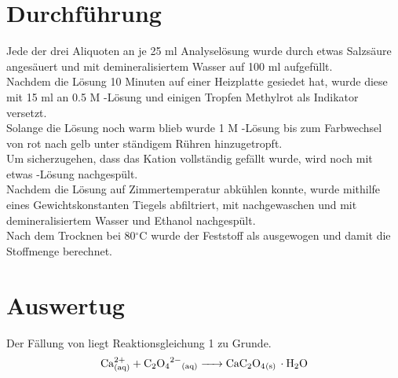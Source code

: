 \documentclass[12pt]{scrartcl} %
\newcommand{\celsius}{^{\circ}\mathrm{C}} %
\begin{document}
\section{Durchführung}
Jede der drei Aliquoten an je 25 ml Analyselösung wurde durch etwas Salzsäure angesäuert und mit demineralisiertem Wasser auf 100 ml aufgefüllt.\\
Nachdem die Lösung 10 Minuten auf einer Heizplatte gesiedet hat, wurde diese mit 15 ml an 0.5 M -Lösung und einigen Tropfen Methylrot als Indikator versetzt.\\
Solange die Lösung noch warm blieb wurde 1 M -Lösung bis zum Farbwechsel von rot nach gelb unter ständigem Rühren hinzugetropft.\\
Um sicherzugehen, dass das Kation vollständig gefällt wurde, wird noch mit etwas -Lösung nachgespült.\\
Nachdem die Lösung auf Zimmertemperatur abkühlen konnte, wurde mithilfe eines Gewichtskonstanten Tiegels abfiltriert, mit  nachgewaschen und mit demineralisiertem Wasser und Ethanol nachgespült.\\
Nach dem Trocknen bei 80$\celsius$ wurde der Feststoff als  ausgewogen und damit die Stoffmenge berechnet.\\

\newpage

\section{Auswertug}

Der Fällung von  liegt Reaktionsgleichung 1 zu Grunde.\\
\begin{equation}
  \ce{Ca^{2+}_{(aq)} + C2O4^{2-}_{(aq)} -> CaC2O4_{(s)} \cdot H2O}
\end{equation}
\end{document}
